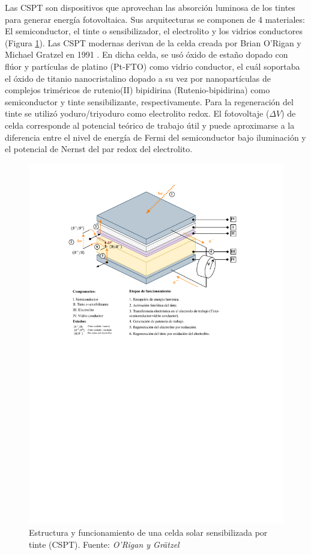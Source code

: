 Las CSPT son dispositivos que aprovechan las absorción luminosa de los tintes para generar energía fotovoltaica. Sus arquitecturas se componen de 4 materiales: El semiconductor, el tinte o sensibilizador, el electrolito y los vidrios conductores (Figura \ref{img:CSPT}). Las CSPT modernas derivan de la celda creada por Brian O'Rigan y Michael Gratzel en 1991 \cite{o1991low}. En dicha celda, se usó óxido de estaño dopado con flúor y partículas de platino (Pt-FTO) como vidrio conductor, el cuál soportaba el óxido de titanio  nanocristalino dopado a su vez por nanopartículas de complejos triméricos de rutenio(II) bipidirina (Rutenio-bipidirina) como semiconductor y tinte sensibilizante, respectivamente. Para la regeneración del tinte se utilizó yoduro/triyoduro como electrolito redox. El fotovoltaje ($\Delta V$) de celda corresponde al potencial teórico de trabajo útil y puede aproximarse a la diferencia entre el nivel de energía de Fermi del semiconductor bajo iluminación y el potencial de Nernst del par redox del electrolito.


\begin{figure}[!thb]
    \begin{center}
        \includegraphics[clip, trim=0.5cm 14cm 0.5cm 1cm, width=1.00\textwidth]{img/diagrama_tesis.pdf}
    \end{center}
    \caption{Estructura y funcionamiento de una celda solar sensibilizada por tinte (CSPT). Fuente: \textit{O'Rigan y Grätzel} \cite{o1991low}}
    \label{img:CSPT}
\end{figure}

